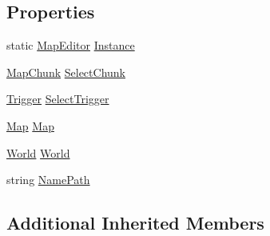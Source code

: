 \subsection*{Properties}
\begin{DoxyCompactItemize}
\item 
static \hyperlink{classgearit_1_1src_1_1editor_1_1map_1_1_map_editor}{Map\+Editor} \hyperlink{classgearit_1_1src_1_1editor_1_1map_1_1_map_editor_a0f4982ba18a475f77638276aec9dcd44}{Instance}
\item 
\hyperlink{classgearit_1_1src_1_1editor_1_1map_1_1_map_chunk}{Map\+Chunk} \hyperlink{classgearit_1_1src_1_1editor_1_1map_1_1_map_editor_a9b470c9742dff0859bf17de6ad4476b4}{Select\+Chunk}
\item 
\hyperlink{classgearit_1_1src_1_1map_1_1_trigger}{Trigger} \hyperlink{classgearit_1_1src_1_1editor_1_1map_1_1_map_editor_a1df353b14da747b5faa6fc5e9aaf71e9}{Select\+Trigger}
\item 
\hyperlink{classgearit_1_1src_1_1map_1_1_map}{Map} \hyperlink{classgearit_1_1src_1_1editor_1_1map_1_1_map_editor_a3412ce3f8ad8152b102a399a9fe8fd44}{Map}
\item 
\hyperlink{class_farseer_physics_1_1_dynamics_1_1_world}{World} \hyperlink{classgearit_1_1src_1_1editor_1_1map_1_1_map_editor_ada2c04f5469b9873b634e11ab602eadb}{World}
\item 
string \hyperlink{classgearit_1_1src_1_1editor_1_1map_1_1_map_editor_a4fdc7890db446a2709f459e55e4bb369}{Name\+Path}
\end{DoxyCompactItemize}
\subsection*{Additional Inherited Members}


